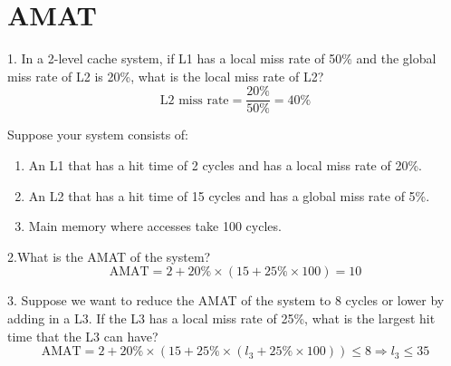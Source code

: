 \documentclass{article}
\begin{document}
\section{AMAT}
1. In a 2-level cache system, if L1 has a local miss rate of 50\% and the global miss rate of L2 is 20\%, what is the local miss rate of L2?\\

$$\mbox{L2 miss rate}=\frac{20\%}{50\%}=40\%$$

Suppose your system consists of:\par
\begin{enumerate}
    \item An L1 that has a hit time of 2 cycles and has a local miss rate of 20\%.
    \item An L2 that has a hit time of 15 cycles and has a global miss rate of 5\%.
    \item Main memory where accesses take 100 cycles.
\end{enumerate}
2.What is the AMAT of the system?\\

$$\mbox{AMAT}=2+20\%\times(15+25\%\times100)=10$$

3. Suppose we want to reduce the AMAT of the system to 8 cycles or lower by adding in a L3. If the L3 has a local miss rate of 25\%, what is the largest hit time that the L3 can have?\\

$$\mbox{AMAT}=2+20\%\times(15+25\%\times(l_3+25\%\times100))\leq8\Rightarrow l_3\leq35$$
\end{document}
